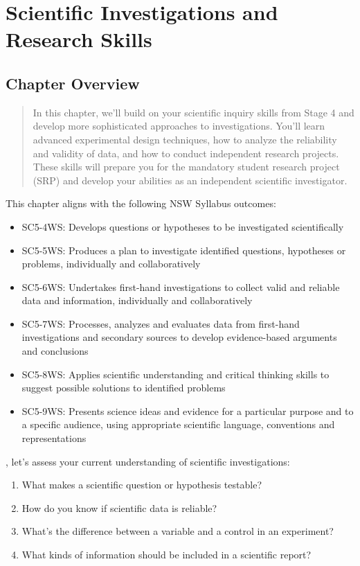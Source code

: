 \chapter{Scientific Investigations and Research Skills}

\section*{Chapter Overview}

\begin{quote}
    In this chapter, we'll build on your scientific inquiry skills from Stage 4 and develop more sophisticated approaches to investigations. You'll learn advanced experimental design techniques, how to analyze the reliability and validity of data, and how to conduct independent research projects. These skills will prepare you for the mandatory student research project (SRP) and develop your abilities as an independent scientific investigator.
\end{quote}

\noindent This chapter aligns with the following NSW Syllabus outcomes:
\begin{itemize}
    \item SC5-4WS: Develops questions or hypotheses to be investigated scientifically
    \item SC5-5WS: Produces a plan to investigate identified questions, hypotheses or problems, individually and collaboratively
    \item SC5-6WS: Undertakes first-hand investigations to collect valid and reliable data and information, individually and collaboratively
    \item SC5-7WS: Processes, analyzes and evaluates data from first-hand investigations and secondary sources to develop evidence-based arguments and conclusions
    \item SC5-8WS: Applies scientific understanding and critical thinking skills to suggest possible solutions to identified problems
    \item SC5-9WS: Presents science ideas and evidence for a particular purpose and to a specific audience, using appropriate scientific language, conventions and representations
\end{itemize}

, let's assess your current understanding of scientific investigations:

\begin{stopandthink}
\begin{enumerate}
    \item What makes a scientific question or hypothesis testable?
    \item How do you know if scientific data is reliable?
    \item What's the difference between a variable and a control in an experiment?
    \item What kinds of information should be included in a scientific report?
\end{enumerate}
\end{stopandthink}

